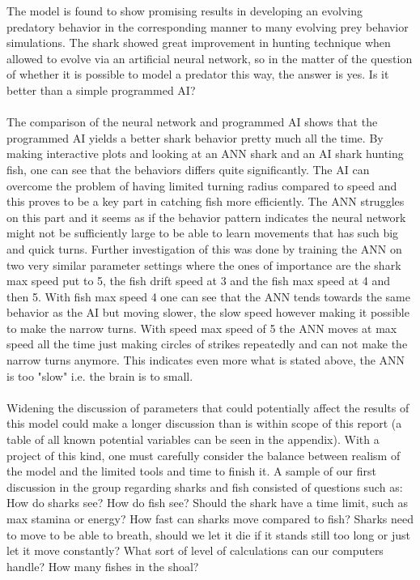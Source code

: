 The model is found to show promising results in developing an evolving predatory
behavior in the corresponding manner to many evolving prey behavior
simulations. The shark showed great improvement in hunting technique when
allowed to evolve via an artificial neural network, so in the matter of the question of whether it is possible to model a predator this way, the answer is yes. Is it better than a simple programmed AI?\\
\\
The comparison of the neural network and programmed AI shows that the
programmed AI yields a better shark behavior pretty much all the time. By making interactive plots and looking at an ANN shark and an AI shark hunting fish, one can see that the behaviors differs quite significantly. The AI can overcome the problem of having limited turning radius compared to speed and this proves to be a key part in catching fish more efficiently. The ANN struggles on this part and it seems as if the behavior pattern indicates the neural network might not be sufficiently large to be able to learn movements that has such big and quick turns. Further investigation of this was done by training the ANN on two very similar parameter settings where the ones of importance are the shark max speed put to 5, the fish drift speed at 3 and the fish max speed at 4 and then 5. With fish max speed 4 one can see that the ANN tends towards the same behavior as the AI but moving slower, the slow speed however making it possible to make the narrow turns. With speed max speed of 5 the ANN moves at max speed all the time just making circles of strikes repeatedly and can not make the narrow turns anymore. This indicates even more what is stated above, the ANN is too "slow" i.e. the brain is to small.\\
\\
Widening the discussion of parameters that could potentially affect the results of this model could make a longer discussion than is within scope of this report (a table of all known potential variables can be seen in the appendix). With a project of this kind, one must carefully consider the balance between realism of the model and the limited tools and time to finish it. A sample of our first discussion in the group regarding sharks and fish consisted of questions such as: How do sharks see? How do fish see? Should the shark have a time limit, such as max stamina or energy? How fast can sharks move compared to fish? Sharks need to move to be able to breath, should we let it die if it stands still too long or just let it move constantly? What sort of level of calculations can our computers handle? How many fishes in the shoal?\\
